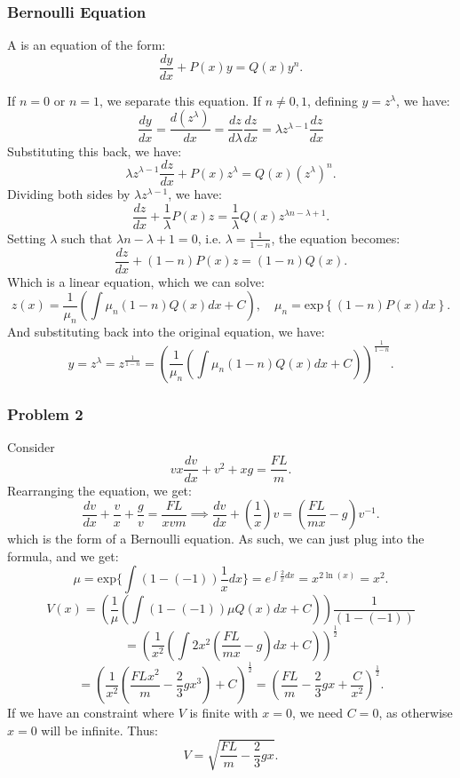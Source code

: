 \documentclass[../main/main.tex]{subfiles}
\begin{document}
	\subsubsection{Bernoulli Equation}
	\begin{definition}
		A  is an equation of the form:  \[
			\frac{dy}{dx}+P(x)y=Q(x)y^{n}
		.\] 
	\end{definition}
If $n=0$ or $n=1$, we separate this equation. If $n\neq 0,1$, defining $y=z^{\lambda}$, we have: \[
	\frac{dy}{dx}=\frac{d(z^{\lambda})}{dx}=\frac{dz}{d\lambda} \frac{dz}{dx}= \lambda z^{\lambda-1} \frac{dz}{dx}
\]  Substituting this back, we have: \[
\lambda z^{\lambda-1}\frac{dz}{dx}+P(x)z^{\lambda}=Q(x)(z^{\lambda})^{n}
.\] Dividing both sides by  $\lambda z^{\lambda-1}$, we have: \[
\frac{dz}{dx}+\frac{1}{\lambda}P(x)z= \frac{1}{\lambda}Q(x)z^{\lambda n-\lambda+1}
.\] Setting $\lambda$ such that $\lambda n-\lambda+1=0$, i.e.  $\lambda=\frac{1}{1-n}$, the equation becomes: \[
\frac{dz}{dx}+(1-n)P(x)z=(1-n)Q(x)
.\] Which is a linear equation, which we can solve: \[
z(x) =\frac{1}{\mu_n}\left( \int \mu_n(1-n) Q(x)dx+C \right) ,\quad \mu_n = \text{exp}\left\{(1-n)P(x) dx\right\}
.\] And substituting back into the original equation, we have: \[
y=z^{\lambda}=z^{\frac{1}{1-n}} = \left( \frac{1}{\mu_n}\left( \int\mu_n(1-n)Q(x)dx+C \right)  \right) ^{\frac{1}{1-n}}
.\] 

\subsubsection{Problem 2}
Consider \[vx \frac{dv}{dx}+v^2+xg=\frac{FL}{m}.\] Rearranging the equation, we get: \[
	\frac{dv}{dx}+\frac{v}{x}+\frac{g}{v}= \frac{FL}{xvm} \implies  \frac{dv}{dx}+\left( \frac{1}{x} \right) v = \left( \frac{FL}{mx}-g \right) v^{-1}
.\] which is the form of a Bernoulli equation. As such, we can just plug into the formula, and we get: \[
\mu = \text{exp}\{\int(1-(-1))\frac{1}{x}dx\}= e^{\int \frac{2}{x}dx} = x^{2\ln(x)} = x^2
.\] \[
V(x) = \left( \frac{1}{\mu}\left( \int(1-(-1))\mu Q(x)dx +C\right)  \right) \frac{1}{(1-(-1))}
\] \[
=\left( \frac{1}{x^2}\left( \int 2 x^2\left( \frac{FL}{mx}-g \right) dx+C \right)  \right) ^{\frac{1}{2}}
\] \[
=\left( \frac{1}{x^2}\left( \frac{FLx^2}{m}-\frac{2}{3}gx^3 \right) +C \right) ^{\frac{1}{2}}=\left( \frac{FL}{m}-\frac{2}{3}gx+\frac{C}{x^2} \right) ^{\frac{1}{2}}
.\] If we have an constraint where $V$ is finite with $x=0$, we need $C=0$, as otherwise $x=0$ will be infinite. Thus: \[
V=\sqrt{\frac{FL}{m}-\frac{2}{3}gx} 
.\] 
\end{document}
